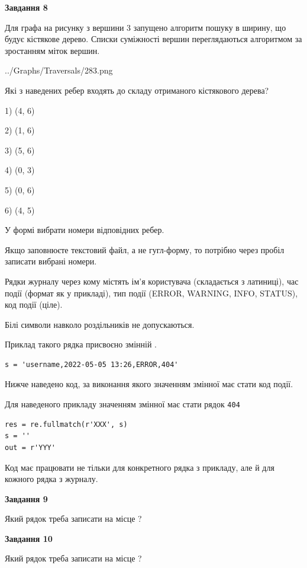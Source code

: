 \documentclass[12pt, ukrainian]{article}
\def\code#1{\Verb!#1!}
\begin{document}
{\begin {large}
{\begin {center}\textbf{Завдання 8}\end {center}}\par
Для графа на рисунку з вершини 3 запущено алгоритм пошуку в ширину, що будує кістякове дерево. Списки суміжності вершин переглядаються алгоритмом за зростанням міток вершин.\par
\begin{center}
	{../Graphs/Traversals/283.png}
\end{center}
\par Які з наведених ребер входять до складу отриманого кістякового дерева?\par
1) (4, 6)\par
2) (1, 6)\par
3) (5, 6)\par
4) (0, 3)\par
5) (0, 6)\par
6) (4, 5)\par
{\vskip 15pt} У формі вибрати номери відповідних ребер.


Якщо заповнюєте текстовий файл, а не гугл-форму, то потрібно через пробіл записа\-ти вибрані номери.\par
\newpage


Рядки журналу через кому містять ім'я користувача (складається з латиниці), час події (фор\-мат як у прикладі), тип події (ERROR, WARNING, INFO, STATUS), код події (ціле).

Білі символи навколо роздільників не допускаються.

Приклад такого рядка присвоєно змінній .



\begin{verbatim}
s = 'username,2022-05-05 13:26,ERROR,404'
\end{verbatim}


Нижче наведено код, за виконання якого значенням змінної  має стати код події.

Для наведеного прикладу значенням змінної  має стати рядок \code{404}



\begin{verbatim}
res = re.fullmatch(r'XXX', s)
s = ''
out = r'YYY'
\end{verbatim}


Код має працювати не тільки для конкретного рядка з прикладу, але й для кожного рядка з журналу.

{\begin {center}\textbf{Завдання 9}\end {center}}\par
Який рядок треба записати на місце  ?\par
\vspace{5mm}


{\begin {center}\textbf{Завдання 10}\end {center}}\par
Який рядок треба записати на місце  ?\par


\newpage


\end {large}}
\end{document}
